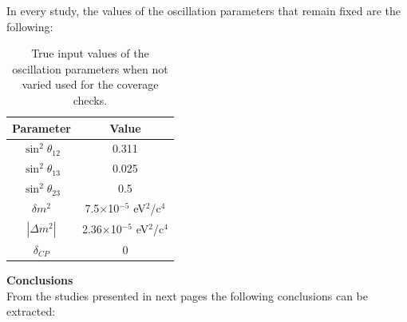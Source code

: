 In every study, the values of the oscillation parameters that remain fixed are the following:

\begin{table}[h]
\centering
\begin{tabular}{|c|c|}
\hline
Parameter & Value \\
\hline
\hline
$\sin^{2}\theta_{12}$ & 0.311 \\
\hline 
$\sin^{2}\theta_{13}$ & 0.025 \\
\hline 
$\sin^{2}\theta_{23}$ & 0.5 \\
\hline 
$\delta m^{2}$ & 7.5$\times$10$^{-5}$ eV$^{2}$/c$^{4}$ \\
\hline
$|\Delta m^{2}|$ & 2.36$\times$10$^{-5}$ eV$^{2}$/c$^{4}$ \\
\hline
$\delta_{CP}$ & 0 \\
\hline
\end{tabular}
\caption{True input values of the oscillation parameters when not varied used for the coverage checks.}
\label{tab:truecovchecks}
\end{table}


{\bf{Conclusions}} \\


From the studies presented in next pages the following conclusions can be extracted:

